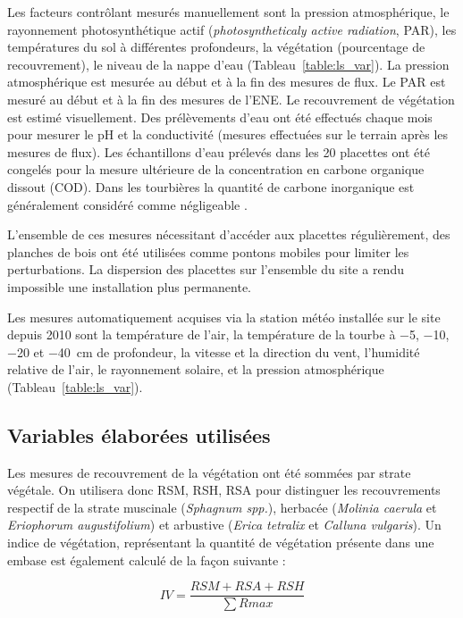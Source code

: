 Les facteurs contrôlant mesurés manuellement sont la pression atmosphérique, le rayonnement photosynthétique actif (\textit{photosyntheticaly active radiation}, PAR), les températures du sol à différentes profondeurs, la végétation (pourcentage de recouvrement), le niveau de la nappe d'eau (Tableau~\ref{table:ls_var}).
La pression atmosphérique est mesurée au début et à la fin des mesures de flux.
Le PAR est mesuré au début et à la fin des mesures de l'ENE.
Le recouvrement de végétation est estimé visuellement.
Des prélèvements d'eau ont été effectués chaque mois pour mesurer le pH et la conductivité (mesures effectuées sur le terrain après les mesures de flux).
Les échantillons d'eau prélevés dans les 20 placettes ont été congelés pour la mesure ultérieure de la concentration en carbone organique dissout (COD).
Dans les tourbières la quantité de carbone inorganique est généralement considéré comme négligeable \citep{worrall2009}.

L'ensemble de ces mesures nécessitant d'accéder aux placettes régulièrement, des planches de bois ont été utilisées comme pontons mobiles pour limiter les perturbations. La dispersion des placettes sur l'ensemble du site a rendu impossible une installation plus permanente.

Les mesures automatiquement acquises via la station météo installée sur le site depuis 2010 sont la température de l'air, la température de la tourbe à \num{-5}, \num{-10}, \num{-20} et \SI{-40}{\centi\metre} de profondeur, la vitesse et la direction du vent, l'humidité relative de l'air, le rayonnement solaire, et la pression atmosphérique (Tableau~\ref{table:ls_var}).

\subsection{Variables élaborées utilisées}

Les mesures de recouvrement de la végétation ont été sommées par strate végétale.
On utilisera donc RSM, RSH, RSA pour distinguer les recouvrements respectif de la strate muscinale (\textit{Sphagnum spp.}), herbacée (\textit{Molinia caerula} et \textit{Eriophorum augustifolium}) et arbustive (\textit{Erica tetralix} et \textit{Calluna vulgaris}).
Un indice de végétation, représentant la quantité de végétation présente dans une embase est également calculé de la façon suivante : 

\begin{equation}
IV = \frac{RSM + RSA + RSH}{\sum R{max}}
\end{equation}


